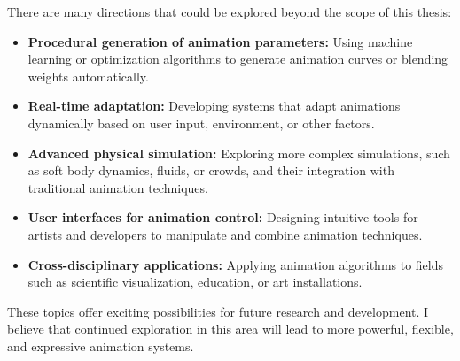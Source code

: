 There are many directions that could be explored beyond the scope of this thesis:
\begin{itemize}
	\item \textbf{Procedural generation of animation parameters:} Using machine learning or optimization algorithms to generate animation curves or blending weights automatically.
	\item \textbf{Real-time adaptation:} Developing systems that adapt animations dynamically based on user input, environment, or other factors.
	\item \textbf{Advanced physical simulation:} Exploring more complex simulations, such as soft body dynamics, fluids, or crowds, and their integration with traditional animation techniques.
	\item \textbf{User interfaces for animation control:} Designing intuitive tools for artists and developers to manipulate and combine animation techniques.
	\item \textbf{Cross-disciplinary applications:} Applying animation algorithms to fields such as scientific visualization, education, or art installations.
\end{itemize}

These topics offer exciting possibilities for future research and development. I believe that continued exploration in this area will lead to more powerful, flexible, and expressive animation systems.
